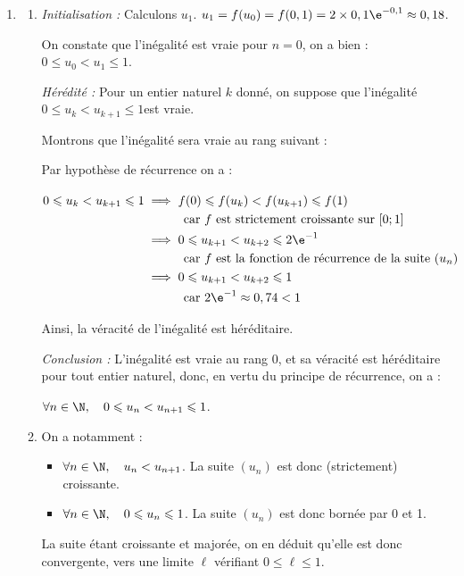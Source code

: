 \begin{enumerate}
		\item 
		\begin{enumerate}
			\item \emph{Initialisation :} Calculons $u_1$. $u_1 = f(u_0) = f(0,1) = 2\times 0,1\e^{-0,1} \approx 0,18$.

On constate que l'inégalité est vraie pour $n = 0$, on a bien : \quad $ 0\leqslant u_0 < u_1 \leqslant 1$.

\smallskip

\emph{Hérédité :} Pour un entier naturel $k$ donné, on suppose que l'inégalité \quad $ 0\leqslant u_k < u_{k+1} \leqslant 1$\quad est vraie.

Montrons que l'inégalité sera vraie au rang suivant :

Par hypothèse de récurrence on a :

$ \aligned[t] 0\leqslant u_k < u_{k+1} \leqslant 1
&\implies f(0) \leqslant f(u_k) < f(u_{k+1}) \leqslant f(1)\\
&\hphantom{\implies}\quad \text{car $f$ est strictement croissante sur }[0 ; 1]\\
&\implies 0 \leqslant u_{k+1 } < u_{k+2} \leqslant 2\e^{-1}\\
&\hphantom{\implies}\quad \text{car $f$ est la fonction de récurrence de la suite  } (u_n)\\
&\implies 0 \leqslant u_{k+1 } < u_{k+2} \leqslant 1\\
&\hphantom{\implies}\quad \text{car } 2\e^{-1} \approx 0,74 < 1\\		\endaligned$


Ainsi, la véracité de l'inégalité est héréditaire.

\smallskip

\emph{Conclusion :} L'inégalité est vraie au rang 0, et sa véracité est héréditaire pour tout entier naturel, donc, en vertu du principe de récurrence, on a :

$\forall n \in \N,\quad 0 \leqslant u_{n} < u_{n+1} \leqslant 1$.

		\item On a notamment :
\begin{itemize}
\item $\forall n \in \N,\quad u_{n} < u_{n+1}$. \quad La suite $(u_n)$ est donc (strictement) croissante.
\item $\forall n \in \N,\quad 0 \leqslant u_{n}\leqslant 1$. \quad La suite $(u_n)$ est donc bornée par 0 et 1.
\end{itemize}

La suite étant croissante et majorée, on en déduit qu'elle est donc convergente, vers une limite $\ell$ vérifiant $0 \leqslant \ell \leqslant 1$.
		\end{enumerate}


\end{enumerate}
